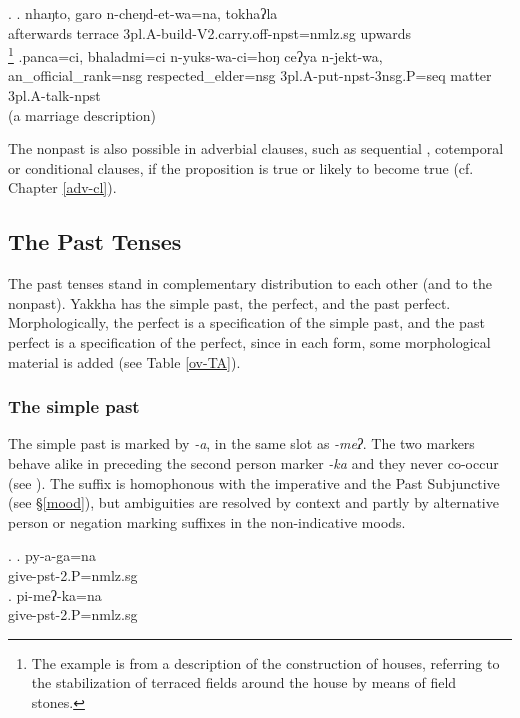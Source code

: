 \ex. \ag. nhaŋto, garo n-cheŋd-et-wa=na,      tokhaʔla\\
afterwards terrace {\sc 3pl.A-}build{\sc -V2.carry.off-npst=nmlz.sg} upwards\\
\footnote{The example is from a description of the  construction of houses, referring to the stabilization of terraced fields around the house by means of field stones.}  
\bg.panca=ci, bhaladmi=ci n-yuks-wa-ci=hoŋ  ceʔya n-jekt-wa,\\
an\_official\_rank{\sc =nsg} respected\_elder{\sc =nsg} {\sc 3pl.A-}put{\sc -npst-3nsg.P=seq} matter {\sc 3pl.A-}talk{\sc -npst}\\
 (a marriage description) 

The nonpast is also possible in adverbial  clauses, such as sequential \Last[b], cotemporal or conditional clauses, if the proposition is true or likely to become true (cf. Chapter \ref{adv-cl}). 

\subsection{The Past Tenses}\label{pst}

The past tenses stand in complementary distribution to each other (and to the nonpast). Yakkha has the simple past, the perfect, and the past perfect. Morphologically, the perfect is a specification of the simple past, and the past perfect is a specification of the perfect, since in each form, some morphological material is added (see Table \ref{ov-TA}).

\subsubsection{The simple past}\label{sim-pst}

The simple past is marked by \emph{-a}, in the same slot as \emph{-meʔ}. The two markers behave alike in preceding the second person marker \emph{-ka} and they never co-occur (see \Next). The suffix is homophonous with the imperative and the Past Subjunctive (see §\ref{mood}), but ambiguities are resolved by context and partly by alternative person or negation marking suffixes in the non-indicative moods.

\ex. \ag.  py-a-ga=na\\
			give{\sc [3.A]-pst-2.P=nmlz.sg}\\
	\bg. pi-meʔ-ka=na\\ 
			give{\sc [3.A]-pst-2.P=nmlz.sg}\\
			
